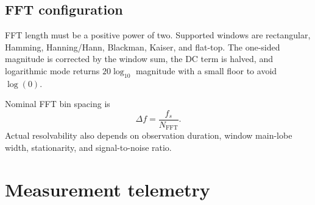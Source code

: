 \documentclass[10pt,a4paper]{article}
\begin{document}
\subsection{FFT configuration}

FFT length must be a positive power of two. Supported windows are rectangular, Hamming, Hanning/Hann, Blackman, Kaiser, and flat-top. The one-sided magnitude is corrected by the window sum, the DC term is halved, and logarithmic mode returns $20\log_{10}$ magnitude with a small floor to avoid $\log(0)$.

Nominal FFT bin spacing is
\[
\Delta f = \frac{f_s}{N_{\mathrm{FFT}}}.
\]
Actual resolvability also depends on observation duration, window main-lobe width, stationarity, and signal-to-noise ratio.

\section{Measurement telemetry}
\end{document}
